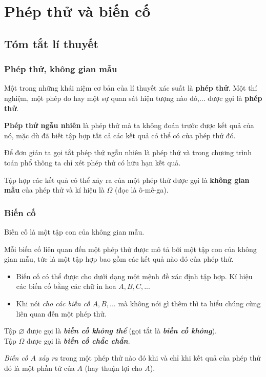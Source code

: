 \section{Phép thử và biến cố}
\subsection{Tóm tắt lí thuyết}
\subsubsection{Phép thử, không gian mẫu}
Một trong những khái niệm cơ bản của lí thuyết xác suất là {\bf phép thử}. Một thí nghiệm, một phép đo hay một sự quan sát hiện tượng nào đó,... được gọi là {\bf phép thử}.

\begin{dn}
{\bf Phép thử ngẫu nhiên} là phép thử mà ta không đoán trước được kết quả của nó, mặc dù đã biết tập hợp tất cả các kết quả có thể có của phép thử đó.
\end{dn}
\begin{note}
Để đơn giản ta gọi tắt phép thử ngẫu nhiên là phép thử và trong chương trình toán phổ thông ta chỉ xét phép thử có hữu hạn kết quả.
\end{note}
\begin{dn}
Tập hợp các kết quả có thể xảy ra của một phép thử được gọi là {\bf không gian mẫu} của phép thử và kí hiệu là $\Omega$ (đọc là ô-mê-ga).
\end{dn}

\subsubsection{Biến cố}

\begin{dn}
Biến cố là một tập con của không gian mẫu.
\end{dn}
Mỗi biến cố liên quan đến một phép thử được mô tả bởi một tập con của không gian mẫu, tức là một tập hợp bao gồm các kết quả nào đó của phép thử.\\

\begin{note}
\hfill

	\begin{itemize}
		\item Biến cố có thể được cho dưới dạng một mệnh đề xác định tập hợp. Kí hiệu các biến cố bằng các chữ in hoa $A,B,C,...$
		\item Khi nói \textit{cho các biến cố $A,B,...$} mà không nói gì thêm thì ta hiểu chúng cùng liên quan đến một phép thử.
	\end{itemize}
\end{note}
\begin{dn}
	Tập $\varnothing $ được gọi là \textbf{\textit{biến cố không thể}} (gọi tắt là \textbf{\textit{biến cố không}}).\\
	Tập $\Omega$ được gọi là \textbf{\textit{biến cố chắc chắn}}.
\end{dn}
\textit{Biến cố $A$ xảy ra} trong một phép thử nào đó khi và chỉ khi kết quả của phép thử đó là một phần tử của $A$ (hay thuận lợi cho $A$).

